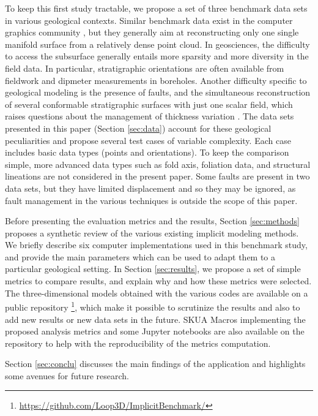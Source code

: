 \documentclass[final]{ring20}
\begin{document}
To keep this first study tractable, we propose a set of three benchmark data sets in various geological contexts. Similar benchmark data exist in the computer graphics community \citep[e.g.,][]{BLNTS13}, but they generally aim at reconstructing only one single manifold surface from a relatively dense point cloud. In geosciences, the difficulty to access the subsurface generally entails more sparsity and more diversity in the field data. In particular, stratigraphic orientations are often available from fieldwork and dipmeter measurements in boreholes. Another difficulty specific to geological modeling is the presence of faults, and the simultaneous reconstruction of several conformable stratigraphic surfaces with just one scalar field, which raises questions about the management of thickness variation \citep{Laurent2016MG}. The data sets presented in this paper (Section \ref{sec:data}) account for these geological peculiarities and propose several test cases of variable complexity. Each case includes basic data types (points and orientations). To keep the comparison simple, more advanced data types such as fold axis, foliation data, and structural lineations are not considered in the present paper. Some faults are present  in two data sets, but they have limited displacement and so they may be ignored, as fault management in the various techniques is outside the scope of this paper. 

Before presenting the evaluation metrics and the results, Section \ref{sec:methods} proposes a synthetic review of the various existing implicit modeling methods. We briefly describe six computer implementations used in this benchmark study, and provide the main parameters which can be used to adapt them to a particular geological setting. In Section \ref{sec:results}, we propose a set of simple metrics to compare results, and explain why and how these metrics were selected. The three-dimensional models obtained with the various codes are available on a public repository \footnote{\url{https://github.com/Loop3D/ImplicitBenchmark/}}, which make it possible to scrutinize the results and also to add new results or new data sets in the future. SKUA Macros implementing the proposed analysis metrics and some Jupyter notebooks are also available on the repository to help with the reproducibility of the metrics computation.  

Section \ref{sec:conclu} discusses the main findings of the application and highlights some avenues for future research. 
\end{document}
